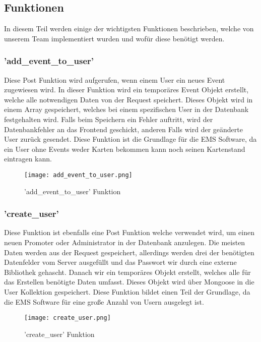 \subsection{Funktionen}
In diesem Teil werden einige der wichtigsten Funktionen beschrieben, welche von unserem Team implementiert wurden und wofür diese benötigt werden. 		 	
\subsubsection{'add\_event\_to\_user'}
Diese Post Funktion wird aufgerufen, wenn einem User ein neues Event zugewiesen wird. 
In dieser Funktion wird ein temporäres Event Objekt erstellt, welche alle notwendigen Daten von der Request speichert. 
Dieses Objekt wird in einem Array gespeichert, welches bei einem spezifischen User in der Datenbank festgehalten wird. 
Falls beim Speichern ein Fehler auftritt, wird der Datenbankfehler an das Frontend geschickt, anderen Falls wird der geänderte User zurück gesendet. 
Diese Funktion ist die Grundlage für die EMS Software, da ein User ohne Events weder Karten bekommen kann noch seinen Kartenstand eintragen kann.		 		
\begin{figure}[H]
	\centering
	\texttt{[image: add\_event\_to\_user.png]}
	\caption{'add\_event\_to\_user' Funktion}
\end{figure}	 	
\newpage
\subsubsection{'create\_user'}
Diese Funktion ist ebenfalls eine Post Funktion welche verwendet wird, um einen neuen Promoter oder Administrator in der Datenbank anzulegen. 
Die meisten Daten werden aus der Request gespeichert, allerdings werden drei der benötigten Datenfelder vom Server ausgefüllt und das Passwort wir durch eine externe Bibliothek gehascht. 
Danach wir ein temporäres Objekt erstellt, welches alle für das Erstellen benötigte Daten umfasst. 
Dieses Objekt wird über Mongoose in die User Kollektion gespeichert. Diese Funktion bildet einen Teil der Grundlage, da die EMS Software für eine große Anzahl von Usern ausgelegt ist. 		 		
\begin{figure}[H]
	\centering
	\texttt{[image: create\_user.png]}
	\caption{'create\_user' Funktion}
\end{figure}		 	
\newpage	
